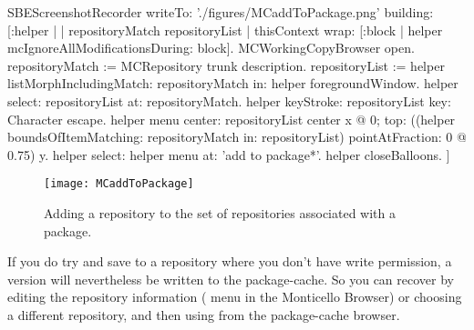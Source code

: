 \documentclass[a4paper,10pt,twoside]{book}
\begin{document}
\begin{ExecuteSmalltalkScript}
SBEScreenshotRecorder writeTo: './figures/MCaddToPackage.png' building: [:helper |
	| repositoryMatch repositoryList |
	thisContext wrap: [:block | helper mcIgnoreAllModificationsDuring: block].
	MCWorkingCopyBrowser open.
	repositoryMatch := MCRepository trunk description.
	repositoryList := helper listMorphIncludingMatch: repositoryMatch in: helper foregroundWindow.
	helper select: repositoryList at: repositoryMatch.
	helper keyStroke: repositoryList key: Character escape.
	helper menu
		center: repositoryList center x @ 0;
		top: ((helper boundsOfItemMatching: repositoryMatch in: repositoryList)
			pointAtFraction: 0 @ 0.75) y.
	helper select: helper menu at: 'add to package*'.
	helper closeBalloons.
]
\end{ExecuteSmalltalkScript}
\begin{figure}[tbp]
	\begin{center}
		\texttt{[image: MCaddToPackage]}
	\end{center}
	\caption{Adding a repository to the set of repositories associated with a package.}
	\label{fig:associateRepository}
\end{figure}

If you do try and save to a repository where you don't have write permission, a version will nevertheless be written to the package-cache.  
So you can recover by editing the repository information ( menu in the Monticello Browser) or choosing a different repository, and then using  from the package-cache browser.
\end{document}
